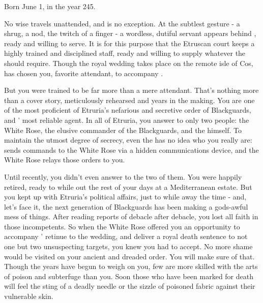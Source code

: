 \documentclass[char]{Kos}
\begin{document}
\name{\cAssassin{}}

Born June 1, in the year 245.

    No wise \cEtruriaKing{\monarch} travels unattended, and \cEtruriaKing{} is no exception. At the subtlest gesture - a shrug, a nod, the twitch of a finger - a wordless, dutiful servant appears behind \cEtruriaKing{\them}, ready and willing to serve. It is for this purpose that the Etruscan court keeps a highly trained and disciplined staff, ready and willing to supply whatever the \cEtruriaKing{\monarch} should require. Though the royal wedding takes place on the remote isle of Cos, \cEtruriaKing{\they} has chosen you, \cEtruriaKing{\their} favorite attendant, to accompany \cEtruriaKing{\them}.

    But you were trained to be far more than a mere attendant. That's nothing more than a cover story, meticulously rehearsed and years in the making. You are one of the most proficient of Etruria's nefarious and secretive order of Blackguards, and \cEtruriaKing{\Monarch} \cEtruriaKing{}' most reliable agent. In all of Etruria, you answer to only two people: the White Rose, the elusive commander of the Blackguards, and the \cEtruriaKing{\Monarch} himself. To maintain the utmost degree of secrecy, even the \cEtruriaKing{\Monarch} has no idea who you really are: \cEtruriaKing{\they} sends \cEtruriaKing{\their} commands to the White Rose via a hidden communications device, and the White Rose relays those orders to you.

    Until recently, you didn't even answer to the two of them. You were happily retired, ready to while out the rest of your days at a Mediterranean estate. But you kept up with Etruria's political affairs, just to while away the time - and, let's face it, the next generation of Blackguards has been making a gods-awful mess of things. After reading reports of debacle after debacle, you lost all faith in those incompetents. So when the White Rose offered you an opportunity to accompany \cEtruriaKing{}' retinue to the wedding, and deliver a royal death sentence to not one but two unsuspecting targets, you knew you had to accept. No more shame would be visited on your ancient and dreaded order. You will make sure of that. Though the years have begun to weigh on you, few are more skilled with the arts of poison and subterfuge than you. Soon those who have been marked for death will feel the sting of a deadly needle or the sizzle of poisoned fabric against their vulnerable skin.
\end{document}
